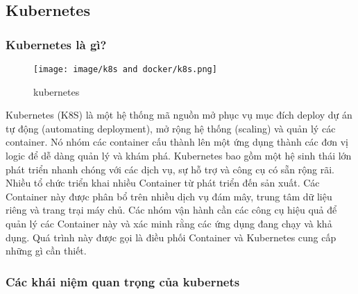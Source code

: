 \documentclass[a4paper,12pt]{article}
\begin{document}
\subsection{ Kubernetes }
\subsubsection{ Kubernetes là gì?}

\begin{figure}[h]
    \centering
    \texttt{[image: image/k8s and docker/k8s.png]}
    \caption{kubernetes}
    \label{fig:ten_hinh}
\end{figure}

Kubernetes (K8S) là một hệ thống mã nguồn mở phục vụ mục đích deploy dự án tự động (automating deployment), mở rộng hệ thống (scaling) và quản lý các container.
Nó nhóm các container cấu thành lên một ứng dụng thành các đơn vị logic để dễ dàng quản lý và khám phá.
Kubernetes bao gồm một 
hệ sinh thái lớn phát triển nhanh chóng với các dịch vụ, sự hỗ trợ và công cụ có sẵn rộng rãi. Nhiều tổ chức triển khai
nhiều Container từ phát triển đến sản xuất. Các Container này được phân bổ trên nhiều dịch vụ đám mây, trung tâm
dữ liệu riêng và trang trại máy chủ. Các nhóm vận hành cần các công cụ hiệu quả để quản lý các Container này và xác minh rằng các ứng dụng đang chạy và khả dụng. Quá trình này được gọi là điều phối Container và Kubernetes
cung cấp những gì cần thiết. 




\subsubsection{ Các khái niệm quan trọng của kubernets}
\end{document}
